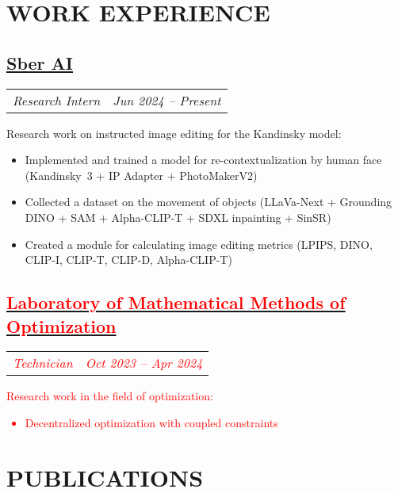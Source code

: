 \documentclass[11pt,a4paper]{moderncv}
\newcommand*{\experienceentry}[4][1.5mm]{
    \subsection{#2} \vspace{-1.5mm}
    \begin{tabularx}{\textwidth}{LR}
        {\itshape #3} & {\itshape #4}
    \end{tabularx}
    \par\addvspace{#1}
}
\begin{document}
\maketitle
\vspace{-1cm}

\begin{minipage}[t]{0.62\textwidth}

\section{WORK EXPERIENCE}
\experienceentry{\href{https://ai.sber.ru/en/about}{Sber AI}}{Research Intern}{Jun 2024 -- Present}{
    Research work on instructed image editing for the Kandinsky model:
    \begin{itemize}
        \item Implemented and trained a model for re-contextualization by human face (Kandinsky~3 + IP Adapter + PhotoMakerV2)
        \item Collected a dataset on the movement of objects (LLaVa-Next + Grounding DINO + SAM + Alpha-CLIP-T + SDXL inpainting + SinSR)
        \item Created a module for calculating image editing metrics (LPIPS, DINO, CLIP-I, CLIP-T, CLIP-D, Alpha-CLIP-T)
    \end{itemize}
}
\experienceentry{\href{https://labmmo.ru/en}{\textcolor{red}{Laboratory of Mathematical Methods of Optimization}}}{\textcolor{red}{Technician}}{\textcolor{red}{Oct 2023 -- Apr 2024}}{
    \textcolor{red}{Research work in the field of optimization:
  \begin{itemize}
      \item Decentralized optimization with coupled constraints
  \end{itemize}}
}

\section{PUBLICATIONS}


\end{minipage}
\end{document}
